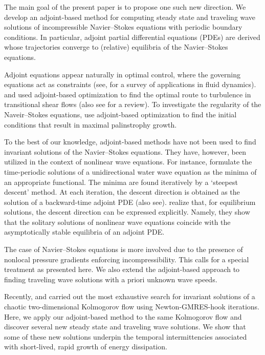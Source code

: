 \documentclass{jfm}
\begin{document}
The main goal of the present paper is to propose one such new direction.
We develop an adjoint-based method for computing steady state and
traveling wave solutions of incompressible Navier--Stokes equations with periodic
boundary conditions. In particular, adjoint partial differential equations (PDEs) are derived whose 
trajectories converge to
(relative) equilibria of the Navier--Stokes equations.

Adjoint equations appear naturally in optimal control, where the governing equations
act as constraints (see, for a survey of applications in fluid dynamics). 
\cite{PK10} and used adjoint-based optimization
to find the optimal route to turbulence in transitional shear flows (also see for a review).
To investigate the regularity of the Naveir--Stokes equations, use
adjoint-based optimization to find the initial conditions that result in maximal palinstrophy growth.

To the best of our knowledge, adjoint-based methods have not been used to 
find invariant solutions of the Navier--Stokes equations. They have, however, been 
utilized in the context of nonlinear wave equations.
For instance, formulate the
time-periodic solutions of a unidirectional water wave equation
as the minima of an appropriate functional. The minima are found 
iteratively by
a `steepest descent' method.
At each iteration,
the descent direction is obtained as the solution of a backward-time adjoint PDE (also see).
\cite{yang07} realize that, for equilibrium solutions, the descent direction can be expressed explicitly.
Namely, they show that the solitary solutions of nonlinear wave equations coincide with the asymptotically stable equilibria of 
an adjoint PDE.

The case of
Navier--Stokes equations is more involved due to
the presence of nonlocal pressure
gradients enforcing incompressibility. This calls for a special treatment
as presented here. We also extend the adjoint-based approach to finding
traveling wave solutions with a priori unknown wave speeds.

Recently, and carried out the most exhaustive search for invariant solutions
of a chaotic two-dimensional Kolmogorov flow using Newton-GMRES-hook iterations.
Here, we apply our adjoint-based method to the same Kolmogorov flow and discover several
new steady state and traveling wave solutions. We show that some of these new
solutions underpin the temporal intermittencies associated with
short-lived, rapid growth of energy dissipation. 
\end{document}
